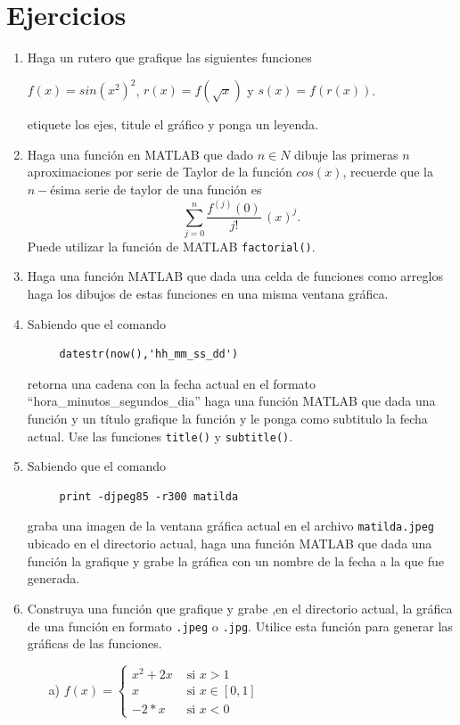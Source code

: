 \documentclass[11pt]{article}
\begin{document}
\section{Ejercicios}
\begin{enumerate}
    \item Haga un rutero que grafique las siguientes funciones
    \begin{center}
    $f(x)=sin(x^2)^2$,  $r(x)=f(\sqrt{x})$ y $s(x)=f(r(x))$.
    \end{center}
    etiquete los ejes, titule el gr\'afico y ponga un leyenda.	
    
    \item Haga una funci\'on en MATLAB que dado $n\in N$ dibuje las primeras $n$ aproximaciones por serie de Taylor 
    de la funci\'on $cos(x)$, recuerde que la $n-$\'esima serie de taylor de una funci\'on es
    $$
    \sum_{j=0} ^ {n} \frac {f^{(j)}(0)}{j!} \, (x)^{j}.
    $$
    Puede utilizar la funci\'on de MATLAB \texttt{factorial()}.
    
    \item Haga una funci\'on MATLAB que dada una celda de funciones como arreglos haga los dibujos de estas funciones 
    en una misma ventana gr\'afica.
    
    \item Sabiendo que el comando 
    \begin{verbatim}
     datestr(now(),'hh_mm_ss_dd')
    \end{verbatim}
    retorna una cadena con la fecha actual en el formato ``hora\_minutos\_segundos\_dia'' haga una funci\'on MATLAB
    que dada una funci\'on y un t\'itulo grafique la funci\'on y le ponga como subtitulo la fecha actual. Use las funciones  
 \texttt{title()} y \texttt{subtitle()}.
    
    \item Sabiendo que el comando
    \begin{verbatim}
     print -djpeg85 -r300 matilda
    \end{verbatim}
    graba una imagen de la ventana gr\'afica actual en el archivo \texttt{matilda.jpeg} 
    ubicado en el directorio actual, haga una funci\'on MATLAB que dada una funci\'on la grafique y grabe la gr\'afica 
    con un nombre de la fecha a la que fue generada.

 \item  
 Construya una funci\'on que grafique y grabe ,en el directorio actual, la gr\'afica de una 
 funci\'on en formato \texttt{.jpeg} o \texttt{.jpg}. Utilice esta 
 funci\'on para generar las gr\'aficas de las funciones.
\begin{multicols}{2}
 \begin{itemize}
  \item[a)] $f(x)=\begin{cases}
                   x^2+2x	& \text{ si } x>1\\
                   x		& \text{ si } x\in [0,1]\\
                   -2*x		& \text{ si } x<0
                  \end{cases}$ 


\end{itemize}
\end{multicols}
\end{enumerate}
\end{document}
